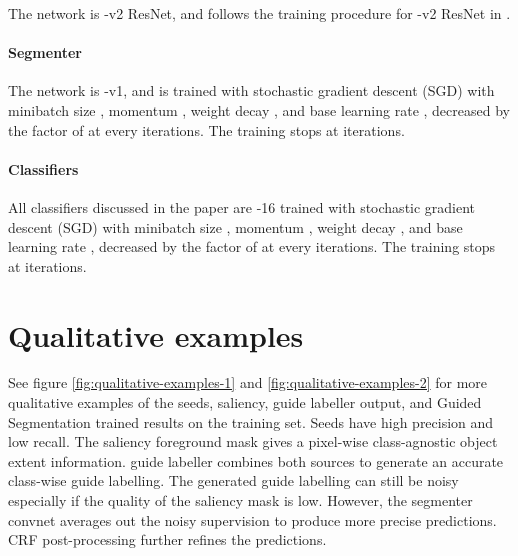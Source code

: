 \documentclass[british,10pt,twocolumn,letterpaper]{article}
\begin{document}
The network is -v2 ResNet, and follows the training
procedure for -v2 ResNet in \cite{Chen2016ArxivDeeplabv2}. 

\paragraph{Segmenter}

The network is -v1, and is trained with stochastic
gradient descent (SGD) with minibatch size , momentum ,
weight decay , and base learning rate , decreased
by the factor of  at every  iterations. The training
stops at  iterations. 

\paragraph{Classifiers}

All classifiers discussed in the paper are -16 trained
with stochastic gradient descent (SGD) with minibatch size ,
momentum , weight decay , and base learning
rate , decreased by the factor of  at every 
iterations. The training stops at  iterations. 

\section{\label{sec:supp-qualitative}Qualitative examples}

See figure \ref{fig:qualitative-examples-1} and \ref{fig:qualitative-examples-2}
for more qualitative examples of the seeds, saliency, 
guide labeller output, and Guided Segmentation trained results on
the training set. Seeds have high precision and low recall. The saliency
foreground mask gives a pixel-wise class-agnostic object extent information.
 guide labeller combines both sources to generate
an accurate class-wise guide labelling. The generated guide labelling
can still be noisy especially if the quality of the saliency mask
is low. However, the segmenter convnet averages out the noisy supervision
to produce more precise predictions. CRF post-processing further refines
the predictions.


\newpage
\end{document}
